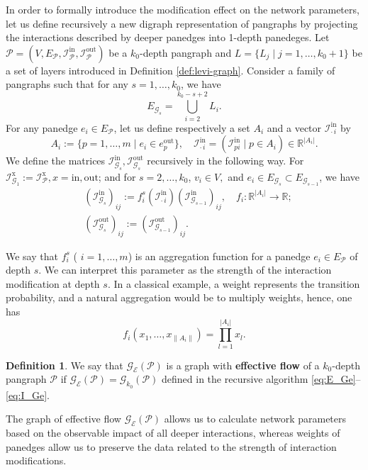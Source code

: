 \documentclass[a4paper,12pt]{article}
\theoremstyle{definition}
\newtheorem{definition}{Definition}
\theoremstyle{remark}
\newcommand{\mG}{\mathcal{G}}
\newcommand{\mP}{\mathcal{P}}
\newcommand{\EG}{E_{\mathcal{G}}}
\newcommand{\EP}{E_{\mathcal{P}}}
\newcommand{\tin}{\mathrm{in}}
\newcommand{\out}{\mathrm{out}}
\newcommand{\inci}{\mathcal{I}^{\tin}}
\newcommand{\inco}{\mathcal{I}^{\out}}
\newcommand{\RR}{\mathbb{R}}
\begin{document}
In order to formally introduce the modification effect on the network parameters, let us define recursively a new digraph representation of pangraphs by projecting the interactions described by deeper panedges into 1-depth panedeges. Let $ \mP=(V,\EP, \inci_{\mP},\inco_{\mP})$ be a $k_0$-depth pangraph and $L=\{L_j\;|\; j=1,\ldots, k_0 +1\}$ be a set of layers introduced in Definition \ref{def:levi-graph}. Consider a family of pangraphs %
 such that for any $s=1,\ldots, k_0$, we have
 \begin{equation}\label{eq:E_Ge}
 E_{\mG_s} = \bigcup_{i=2}^{k_0-s+2} L_i.
 \end{equation}
 For any panedge $e_i\in E_{\mP}$, let us define respectively a set $A_i$ and a vector $\inci_{\cdot \, i}$ by 
 $$A_i:=\{p=1,\ldots, m\;|\; e_i\in e_p^{\out}\},\quad \inci_{\cdot \, i}=(\inci_{pi}\;|\;p\in A_i)\in \RR^{|A_i|}.$$
We define the matrices $\inci_{\mG_s},\inco_{\mG_s}$ recursively in the following way. For $\mathcal{I}^{\text{x}}_{\mG_1}:=\mathcal{I}^{\text{x}}_\mP, x=\tin,\out$; and for $s=2,\ldots,k_0$, $v_i\in V,$ and $e_i\in E_{\mG_s}\subset  E_{\mG_{s-1}}$, we have
\begin{subequations} \label{eq:I_Ge}
\begin{flalign}
&(\inci_{\mG_s})_{ij}:=f_i^s(\inci_{\cdot \, i})(\inci_{\mG_{s-1}})_{ij}, \quad f_i:\RR^{|A_i|}\to \RR;\\[.2cm]
&(\inco_{\mG_s})_{ij}:=(\inco_{\mG_{s-1}})_{ij}.
\end{flalign}
\end{subequations}

We say that $f_i^s$ ( $i=1,\ldots,m$) is an aggregation function for a panedge $e_i\in E_{\mP}$ of depth $s$. We can interpret this parameter as the strength of the interaction modification at depth $s$. In a classical example, a weight represents the transition probability, and a natural aggregation would be to multiply weights, hence, one has 
\begin{equation}\label{eq:agreg_f}
f_i(x_1,\ldots,x_{\|A_{i}\|})=\prod_{l=1}^{|A_i|}x_l.
\end{equation}
\begin{definition} \label{def:eff_flow}We say that $\mG_{\mathcal{E}}(\mP)$ is a graph with \textbf{effective flow} of a $k_0$-depth pangraph $\mP$ if $\mG_{\mathcal{E}}(\mP)=\mG_{k_0}(\mP)$ defined in the recursive algorithm \eqref{eq:E_Ge}--\eqref{eq:I_Ge}.
\end{definition}
The graph of effective flow $\mG_{\mathcal{E}}(\mP)$ allows us to calculate network parameters based on the observable impact of all deeper interactions, whereas weights of panedges allow us to preserve the data related to the strength of interaction modifications. 
\end{document}
